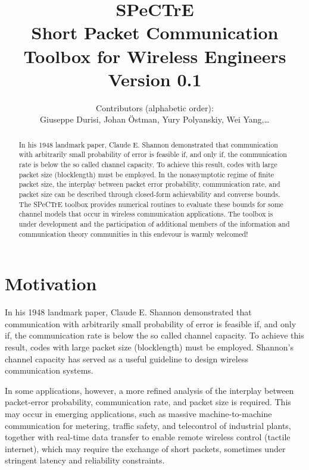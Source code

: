 \documentclass[a4paper,11p]{memoir}
\begin{document}
\title{SPeCTrE\\
Short Packet Communication Toolbox for Wireless Engineers\\[1cm]
Version 0.1}

\author{Contributors (alphabetic order):\\
Giuseppe Durisi, Johan \"Ostman, Yury Polyanskiy, Wei Yang,\dots}


\maketitle

\begin{abstract}

In his 1948 landmark paper, Claude E. Shannon demonstrated that communication with arbitrarily small probability of error is feasible if, and only if, the communication rate is below the so called channel capacity. To achieve this result, codes with large packet size (blocklength) must be employed. 
In the nonasymptotic regime of finite packet size, the interplay between packet error probability, communication rate, and packet size can be described through closed-form achievability and converse bounds.
The SPeCTrE toolbox provides numerical routines to evaluate these bounds for some channel models that occur in wireless communication applications. 
The toolbox is under development and the participation of additional members of the information and communication theory communities in this endevour is warmly welcomed!
\end{abstract}
\newpage
\tableofcontents

\newpage
\chapter{Motivation}
%
  In his 1948 landmark paper, Claude E. Shannon demonstrated that communication with arbitrarily small probability of error is feasible if, and only if, the communication rate is below the so called channel capacity. 
  To achieve this result, codes with large packet size (blocklength) must be employed. 
 Shannon's channel capacity has served as a useful guideline to design wireless communication systems.

In some applications, however, a more refined analysis of the interplay between packet-error probability, communication rate, and packet size is required.
  This may occur in emerging applications, such as massive machine-to-machine communication for metering, traffic safety, and telecontrol of industrial plants, together with real-time data transfer to enable remote wireless control (tactile internet), which may require the exchange of short packets, sometimes under stringent latency and reliability constraints.
  
\end{document}
